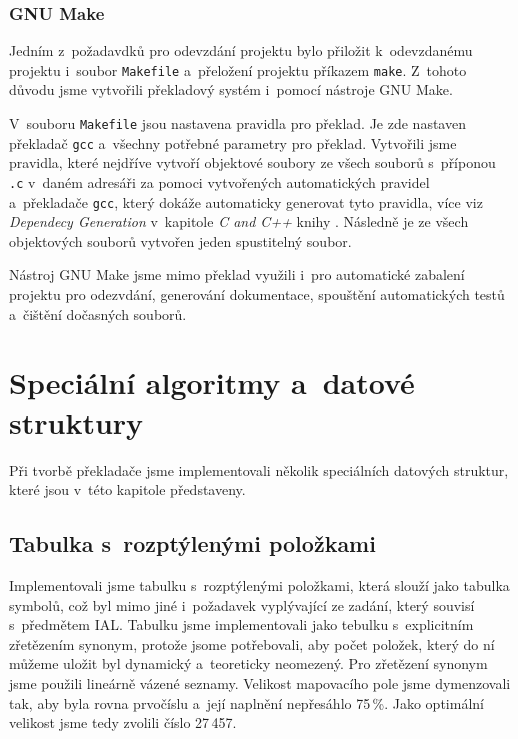 \documentclass[a4paper, 11pt]{article}
\begin{document}
	\subsubsection{GNU Make}

	Jedním z~požadavdků pro odevzdání projektu bylo přiložit k~odevzdanému projektu i~soubor \texttt{Makefile} a~přeložení
	projektu příkazem \texttt{make}. Z~tohoto důvodu jsme vytvořili překladový systém i~pomocí nástroje GNU Make.

	V~souboru \texttt{Makefile} jsou nastavena pravidla pro překlad. Je zde nastaven překladač \texttt{gcc}
	a~všechny potřebné parametry pro překlad. Vytvořili jsme pravidla, které nejdříve vytvoří objektové soubory
	ze všech souborů s~příponou \texttt{.c} v~daném adresáři za pomoci vytvořených automatických pravidel a~překladače \texttt{gcc},
	který dokáže automaticky generovat tyto pravidla, více viz \emph{Dependecy Generation} v~kapitole \emph{C and C++}
	knihy \cite{Mecklenburgc2005}. Následně je ze všech objektových souborů vytvořen jeden spustitelný
	soubor.

	Nástroj GNU Make jsme mimo překlad využili i~pro automatické zabalení projektu pro odezvdání, generování dokumentace,
	spouštění automatických testů a~čištění dočasných souborů.


	\section{Speciální algoritmy a~datové struktury}

	Při tvorbě překladače jsme implementovali několik speciálních datových struktur,
	které jsou v~této kapitole představeny.


	\subsection{Tabulka s~rozptýlenými položkami}

	Implementovali jsme tabulku s~rozptýlenými položkami, která slouží jako tabulka symbolů, což byl mimo
	jiné i~požadavek vyplývající ze zadání, který souvisí s~předmětem IAL. Tabulku jsme implementovali
	jako tebulku s~explicitním zřetězením synonym, protože jsome potřebovali, aby počet položek,
	který do ní můžeme uložit byl dynamický a~teoreticky neomezený. Pro zřetězení synonym jsme použili
	lineárně vázené seznamy. Velikost mapovacího pole jsme dymenzovali tak, aby byla rovna prvočíslu a~její
	naplnění nepřesáhlo 75\,\%. Jako optimální velikost jsme tedy zvolili číslo 27\,457.
\end{document}
